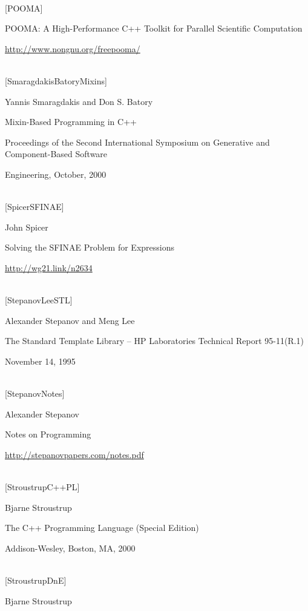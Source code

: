 \hspace*{\fill} \\ %
{[POOMA]}

POOMA: A High-Performance C++ Toolkit for Parallel Scientific Computation

\url{http://www.nongnu.org/freepooma/}


\hspace*{\fill} \\ %
{[SmaragdakisBatoryMixins]}

Yannis Smaragdakis and Don S. Batory

Mixin-Based Programming in C++

Proceedings of the Second International Symposium on Generative and Component-Based Software

Engineering, October, 2000


\hspace*{\fill} \\ %
{[SpicerSFINAE]}

John Spicer

Solving the SFINAE Problem for Expressions

\url{http://wg21.link/n2634}

\hspace*{\fill} \\ %
{[StepanovLeeSTL]}

Alexander Stepanov and Meng Lee

The Standard Template Library – HP Laboratories Technical Report 95-11(R.1)

November 14, 1995

\hspace*{\fill} \\ %
{[StepanovNotes]}

Alexander Stepanov

Notes on Programming

\url{http://stepanovpapers.com/notes.pdf}

\hspace*{\fill} \\ %
{[StroustrupC++PL]}

Bjarne Stroustrup

The C++ Programming Language (Special Edition)

Addison-Wesley, Boston, MA, 2000

\hspace*{\fill} \\ %
{[StroustrupDnE]}

Bjarne Stroustrup

